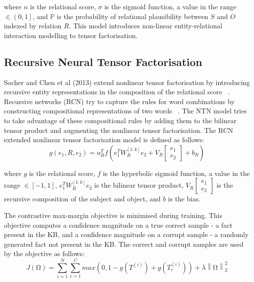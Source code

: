 \noindent where $n$ is the relational score, $\sigma$ is the sigmoid function, a value in the range $\in \left ( 0, 1 \right ]$, and $\mathbb{P}$ is the probability of relational plausibility between $S$ and $O$ indexed by relation $R$. This model introduces non-linear entity-relational interaction modelling to tensor factorisation. 

\subsection{Recursive Neural Tensor Factorisation}
Socher and Chen et al (2013) extend nonlinear tensor factorisation by introducing recursive entity representations in the composition of the relational score \unskip ~\citep{socher2013reasoning}. Recursive networks (RCN) try to capture the rules for word combinations by constructing compositional representations of two words \unskip ~\citep{socher2012semantic}. The NTN model tries to take advantage of these compositional rules by adding them to the bilinear tensor product and augmenting the nonlinear tensor factorisation. The RCN extended nonlinear tensor factorisation model is defined as follows:
\begin{equation}
	g(e_1, R, e_2) =  u_R^Tf(e_1^TW_R^{\left [1:k\right ]}e_2 + V_R\left [ \begin{matrix} e_1 \\ e_2 \end{matrix} \right ] + b_R)
\end{equation}

\noindent where $g$ is the relational score, $f$ is the hyperbolic sigmoid function, a value in the range $\in \left [ -1, 1 \right ]$, $e_1^TW_R^{\left [1:k\right ]}e_2 $ is the bilinear tensor product, $V_R\left [ \begin{matrix} e_1 \\ e_2 \end{matrix} \right ]$ is the recursive composition of the subject and object, and $b$ is the bias. \par

\noindent The contrastive max-margin objective is minimised during training. This objective computes a confidence magnitude on a true correct sample - a fact present in the KB, and a confidence magnitude on a corrupt sample - a randomly generated fact not present in the KB. The correct and corrupt samples are used by the objective as follows:
\begin{equation}
	J(\si{\ohm}) =  \sum_{i=1}^N\sum_{c=1}^Cmax(0,1 - g(T^{(i)}) + g(T_c^{(i)})) + \lambda\left\lVert \si{\ohm} \right\rVert_2^2
\end{equation}

